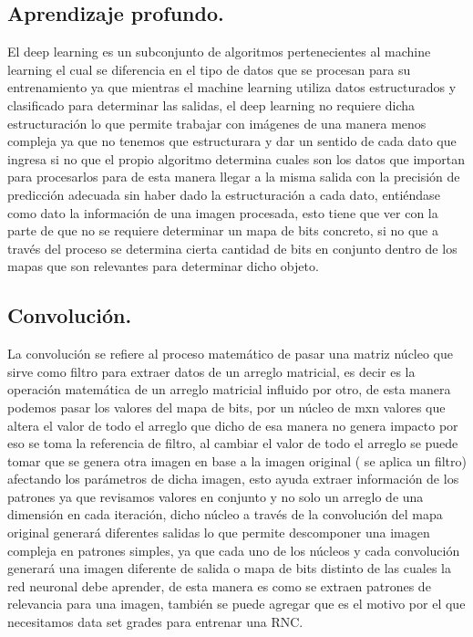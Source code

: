 \documentclass[a4paper, 12pt]{article}
\begin{document}
    \subsection{Aprendizaje profundo.} 
    El deep learning es un subconjunto de algoritmos pertenecientes al machine learning el cual se diferencia en el tipo de datos que se procesan para su entrenamiento ya que mientras el machine learning utiliza datos estructurados y clasificado para determinar las salidas, el deep learning no requiere dicha estructuración lo que permite trabajar con imágenes de una manera menos compleja ya que no tenemos que estructurara y dar un sentido de cada dato que ingresa si no que el propio algoritmo determina cuales son los datos que importan para procesarlos para de esta manera llegar a la misma salida con la precisión de predicción adecuada sin haber dado la estructuración a cada dato, entiéndase como dato la información de una imagen procesada, esto tiene que ver con la parte de que no se requiere determinar un mapa de bits concreto, si no que a través del proceso se determina cierta cantidad de bits en conjunto dentro de los mapas que son relevantes para determinar dicho objeto.  

    \subsection{Convolución.} 
    La convolución se refiere al proceso matemático de pasar una matriz núcleo que sirve como filtro para extraer datos de un arreglo matricial, es decir es la operación matemática de un arreglo matricial influido por otro, de esta manera podemos pasar los valores del mapa de bits, por un núcleo de mxn valores que altera el valor de todo el arreglo que dicho de esa manera no genera impacto por eso se toma la referencia de filtro, al cambiar el valor de todo el arreglo se puede tomar que se genera otra imagen en base a la imagen original ( se aplica un filtro) afectando los parámetros de dicha imagen, esto ayuda extraer información de los patrones ya que revisamos valores en conjunto y no solo un arreglo de una dimensión en cada iteración, dicho núcleo a través de la convolución del mapa original generará diferentes salidas lo que permite descomponer una imagen compleja en patrones simples, ya que cada uno de los núcleos y cada convolución generará una imagen diferente de salida o mapa de bits distinto de las cuales la red neuronal debe aprender, de esta manera es como se extraen patrones de relevancia para una imagen, también se puede agregar que es el motivo por el que necesitamos data set grades para entrenar una RNC.  
\end{document}

